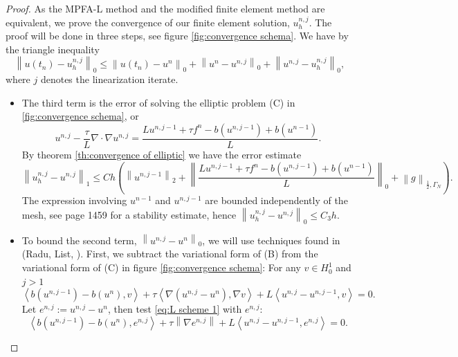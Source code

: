 \documentclass[../Main/main.tex]{subfiles}
\begin{document}
	\begin{proof}
		As the MPFA-L method and the modified finite element method are equivalent, we prove the convergence of our finite element solution, $u^{n,j}_h$.
		The proof will be done in three steps, see figure \ref{fig:convergence schema}.
		We have by the triangle inequality
		\begin{equation}
			\left \|u(t_n)-u_h^{n,j}\right \|_0 \leq\left \|u(t_n) -u^n  \right \|_0 + \left \|u^{n}-u^{n,j}\right \|_0 + \left \|u^{n,j}-u_h^{n,j}\right \|_0,
		\end{equation}
		where $j$ denotes the linearization iterate.
		\begin{itemize}
			\item The third term is the error of solving the elliptic problem (C) in \ref{fig:convergence schema}, or 
			\begin{equation}\label{eq:first ineq}
				u^{n,j}-\frac{\tau}{L} \nabla \cdot \nabla u^{n,j} = \frac{L u^{n,j-1} + \tau f^n - b(u^{n,j-1}) + b(u^{n-1})}{L}.
			\end{equation}
			By theorem \ref{th:convergence of elliptic} we have the error estimate
			\begin{equation}
				\left \|u_h^{n,j}-u^{n,j}\right \|_1  \leq C h (\left \| u^{n,j-1} \right \|_2 + \left \| \frac{L u^{n,j-1} + \tau f^n - b(u^{n,j-1}) + b(u^{n-1})}{L} \right \|_0 + \left \| g \right \|_{\frac{1}{2},\Gamma_N}).
			\end{equation}
			The expression involving $u^{n-1}$ and $u^{n,j-1}$ are bounded independently of the mesh, see \cite{FlorinTimeConvergence} page 1459 for a stability estimate, hence $\left \|u_h^{n,j}-u^{n,j}\right \|_0 \leq C_3h$.
		\item To bound the second term, $\left \|u^{n,j}-u^n\right \|_0$, we will use techniques found in (Radu, List, \cite{list2016study}). First, we subtract the variational form of (B) from the variational form of (C) in figure \ref{fig:convergence schema}:
		For any $v\in H_0^1$ and $j>1$
		\begin{equation}\label{eq:L scheme 1}
			\left\langle b(u^{n,j-1})-b(u^n),v\right \rangle + \tau \left \langle \nabla (u^{n,j}-u^n), \nabla v\right \rangle +L\left \langle u^{n,j}-u^{n,j-1} ,v\right \rangle=0.
		\end{equation}
		Let $e^{n,j}:=u^{n,j}-u^n$, then test \eqref{eq:L scheme 1} with $e^{n,j}$:
		\begin{equation}
\left\langle b(u^{n,j-1})-b(u^n),e^{n,j}\right \rangle + \tau \left \| \nabla e^{n,j}\right \| +L\left \langle u^{n,j}-u^{n,j-1} ,e^{n,j}\right \rangle=0.

\end{equation}
\end{itemize}
\end{proof}
\end{document}
